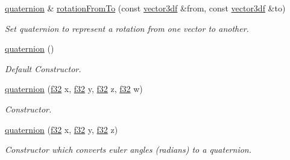 \begin{DoxyCompactItemize}
\mbox{\label{classirr_1_1core_1_1quaternion_a9da1b3ddfb9722f596a73abf5212c020}} 
\hyperlink{classirr_1_1core_1_1quaternion}{quaternion} \& \hyperlink{classirr_1_1core_1_1quaternion_a9da1b3ddfb9722f596a73abf5212c020}{rotation\+From\+To} (const \hyperlink{namespaceirr_1_1core_ae6e2b2a6c552833ebbd5b7463d03586b}{vector3df} \&from, const \hyperlink{namespaceirr_1_1core_ae6e2b2a6c552833ebbd5b7463d03586b}{vector3df} \&to)
\begin{DoxyCompactList}\small\item\em Set quaternion to represent a rotation from one vector to another. \end{DoxyCompactList}\item 
\mbox{\label{classirr_1_1core_1_1quaternion_af19629224bc2ed3a3ecbc335309099c8}} 
\hyperlink{classirr_1_1core_1_1quaternion_af19629224bc2ed3a3ecbc335309099c8}{quaternion} ()
\begin{DoxyCompactList}\small\item\em Default Constructor. \end{DoxyCompactList}\item 
\mbox{\label{classirr_1_1core_1_1quaternion_a7bff9d1ca51483f96094fa5ac9d97342}} 
\hyperlink{classirr_1_1core_1_1quaternion_a7bff9d1ca51483f96094fa5ac9d97342}{quaternion} (\hyperlink{namespaceirr_a0277be98d67dc26ff93b1a6a1d086b07}{f32} x, \hyperlink{namespaceirr_a0277be98d67dc26ff93b1a6a1d086b07}{f32} y, \hyperlink{namespaceirr_a0277be98d67dc26ff93b1a6a1d086b07}{f32} z, \hyperlink{namespaceirr_a0277be98d67dc26ff93b1a6a1d086b07}{f32} w)
\begin{DoxyCompactList}\small\item\em Constructor. \end{DoxyCompactList}\item 
\mbox{\label{classirr_1_1core_1_1quaternion_a299947a6d5c4f3ac2aa64fcffcc11be0}} 
\hyperlink{classirr_1_1core_1_1quaternion_a299947a6d5c4f3ac2aa64fcffcc11be0}{quaternion} (\hyperlink{namespaceirr_a0277be98d67dc26ff93b1a6a1d086b07}{f32} x, \hyperlink{namespaceirr_a0277be98d67dc26ff93b1a6a1d086b07}{f32} y, \hyperlink{namespaceirr_a0277be98d67dc26ff93b1a6a1d086b07}{f32} z)
\begin{DoxyCompactList}\small\item\em Constructor which converts euler angles (radians) to a quaternion. \end{DoxyCompactList}\item 

\end{DoxyCompactItemize}
